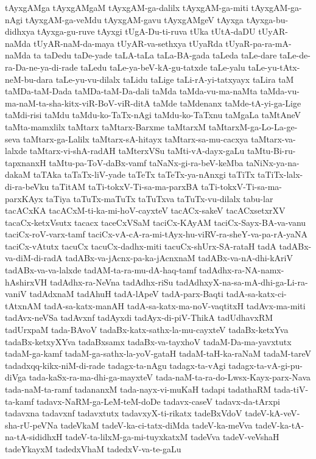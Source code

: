 {tAyxgAMga
tAyxgAMgaM
tAyxgAM-ga-dalilx
tAyxgAM-ga-miti
tAyxgAM-ga-nAgi
tAyxgAM-ga-veMdu
tAyxgAM-gavu
tAyxgAMgeV
tAyxga
tAyxga-bu-didhxya
tAyxga-gu-ruve
tAyxgi
tUgA-Du-ti-ruva
tUka
tUtA-daDU
tUyAR-naMda
tUyAR-naM-da-maya
tUyAR-va-sethxya
tUyaRda
tUyaR-pa-ra-mA-naMda
ta
taDedu
taDe-yade
taLA-taLa
taLa-BA-gada
taLeda
taLe-dare
taLe-de-ra-Da-ne-ya-di-rade
taLedu
taLe-ya-beV-kA-gu-tatxde
taLe-yalu
taLe-yu-tAtx-neM-bu-dara
taLe-yu-vu-dilalx
taLidu
taLige
taLi-rA-yi-tatxyayx
taLira
taM
taMDa-taM-Dada
taMDa-taM-Da-dali
taMda
taMda-vu-ma-naMta
taMda-vu-ma-naM-ta-sha-kitx-viR-BoV-viR-ditA
taMde
taMdenanx
taMde-tA-yi-ga-Lige
taMdi-risi
taMdu
taMdu-ko-TaTx-nAgi
taMdu-ko-TaTxnu
taMgaLa
taMtAneV
taMta-mamxlilx
taMtarx
taMtarx-Barxme
taMtarxM
taMtarxM-ga-Lo-La-ge-seva
taMtarx-ga-Lalilx
taMtarx-sA-hitayx
taMtarx-sa-mu-cacxya
taMtarx-va-lalxde
taMtarx-vi-shA-radAH
taMterxVSu
taMti-vA-dayx-gaLu
taMtu-Bi-ru-tapxnanxH
taMtu-pa-ToV-daBx-vamf
taNaNx-gi-ra-beV-keMba
taNiNx-ya-na-dakaM
taTAka
taTaTx-liV-yade
taTeTx
taTeTx-ya-nAnxgi
taTiTx
taTiTx-lalx-di-ra-beVku
taTitAM
taTi-tokxV-Ti-sa-ma-parxBA
taTi-tokxV-Ti-sa-ma-parxKAyx
taTiya
taTuTx-maTuTx
taTuTxva
taTuTx-vu-dilalx
tabu-lar
tacACxKA
tacACxM-ti-ka-mi-hoV-cayxteV
tacACx-sakeV
tacACxsetxrXV
tacaCx-ketxVsutx
tacacx
taceCxVSaM
taciCx-KAyAM
taciCx-Sayx-BA-va-vanu
taciCx-roV-varx-tamf
taciCx-vA-cA-ra-mi-tAyx-hu-viRV-ra-sheY-va-pa-rA-yaNA
taciCx-vAtutx
tacuCx
tacuCx-dadhx-miti
tacuCx-shUrx-SA-rataH
tadA
tadABx-va-diM-di-radA
tadABx-va-jAcnx-pa-ka-jAcnxnaM
tadABx-va-nA-dhi-kAriV
tadABx-va-va-lalxde
tadAM-ta-ra-mu-dA-haq-tamf
tadAdhx-ra-NA-namx-hAshirxVH
tadAdhx-ra-NeVna
tadAdhx-riSu
tadAdhxyX-na-sa-mA-dhi-ga-Li-ra-vaniV
tadAdxnaM
tadAhuH
tadA-lApeV
tadA-parx-Baqti
tadA-sa-katx-ci-tAtxnAM
tadA-sa-katx-manAH
tadA-sa-katx-ma-noV-vaqtitxH
tadAvx-ma-miti
tadAvx-neVSa
tadAvxnf
tadAyxdi
tadAyx-di-piV-ThikA
tadUdhavxRM
tadUrxpaM
tada-BAvoV
tadaBx-katx-sathx-la-mu-cayxteV
tadaBx-ketxYva
tadaBx-ketxyXYva
tadaBxsamx
tadaBx-va-tayxhoV
tadaM-Da-ma-yavxtutx
tadaM-ga-kamf
tadaM-ga-sathx-la-yoV-gataH
tadaM-taH-ka-raNaM
tadaM-tareV
tadadxqq-kikx-niM-di-rade
tadagx-ta-nAgu
tadagx-ta-vAgi
tadagx-ta-vA-gi-pu-diVga
tada-kaSx-ra-ma-dhi-ga-mayxteV
tada-naM-ta-ra-do-Lwsx-Kayx-parx-Nava
tada-naM-ta-ramf
tadananxM
tada-nayx-vi-muKaH
tadapi
tadathaRM
tada-tiV-ta-kamf
tadavx-NaRM-ga-LeM-teM-doDe
tadavx-caseV
tadavx-da-tArxpi
tadavxna
tadavxnf
tadavxtutx
tadavxyX-ti-rikatx
tadeBxVdoV
tadeV-kA-veV-sha-rU-peVNa
tadeVkaM
tadeV-ka-ci-tatx-diMda
tadeV-ka-meVva
tadeV-ka-tA-na-tA-sididhxH
tadeV-ta-lilxM-ga-mi-tuyxkatxM
tadeVva
tadeV-veVshaH
tadeYkayxM
tadedxVhaM
tadedxV-va-te-gaLu
}
